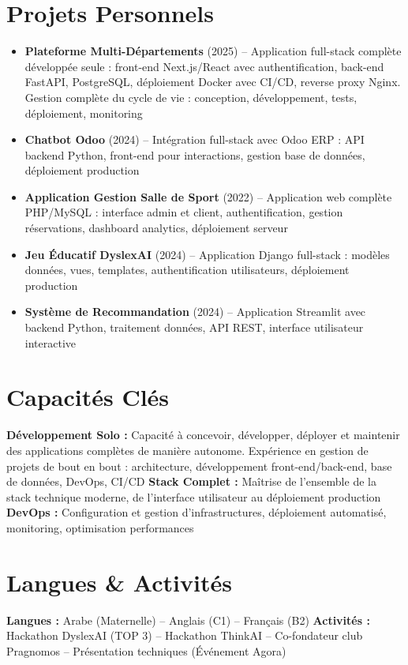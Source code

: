 \documentclass[10pt,a4paper]{article}
\begin{document}
\section*{Projets Personnels}
\begin{itemize}
    \item \textbf{Plateforme Multi-Départements} (2025) -- Application full-stack complète développée seule : front-end Next.js/React avec authentification, back-end FastAPI, PostgreSQL, déploiement Docker avec CI/CD, reverse proxy Nginx. Gestion complète du cycle de vie : conception, développement, tests, déploiement, monitoring
    \item \textbf{Chatbot Odoo} (2024) -- Intégration full-stack avec Odoo ERP : API backend Python, front-end pour interactions, gestion base de données, déploiement production
    \item \textbf{Application Gestion Salle de Sport} (2022) -- Application web complète PHP/MySQL : interface admin et client, authentification, gestion réservations, dashboard analytics, déploiement serveur
    \item \textbf{Jeu Éducatif DyslexAI} (2024) -- Application Django full-stack : modèles données, vues, templates, authentification utilisateurs, déploiement production
    \item \textbf{Système de Recommandation} (2024) -- Application Streamlit avec backend Python, traitement données, API REST, interface utilisateur interactive
\end{itemize}

\section*{Capacités Clés}
\textbf{Développement Solo :} Capacité à concevoir, développer, déployer et maintenir des applications complètes de manière autonome. Expérience en gestion de projets de bout en bout : architecture, développement front-end/back-end, base de données, DevOps, CI/CD \quad
\textbf{Stack Complet :} Maîtrise de l'ensemble de la stack technique moderne, de l'interface utilisateur au déploiement production \quad
\textbf{DevOps :} Configuration et gestion d'infrastructures, déploiement automatisé, monitoring, optimisation performances

\section*{Langues \& Activités}
\textbf{Langues :} Arabe (Maternelle) -- Anglais (C1) -- Français (B2) \quad
\textbf{Activités :} Hackathon DyslexAI (TOP 3) -- Hackathon ThinkAI -- Co-fondateur club Pragnomos -- Présentation techniques (Événement Agora)
\end{document}
